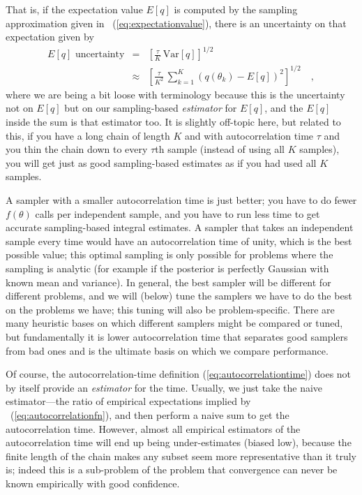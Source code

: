 \documentclass[12pt,twoside,pdftex]{article}
\newcommand{\Var}{\mathrm{Var}}
\newcommand{\pars}{\theta}
\begin{document}
That is, if the expectation value $E[q]$ is computed by the sampling
approximation given in \equationname~(\ref{eq:expectationvalue}),
there is an uncertainty on that expectation given by
\begin{eqnarray}
  \mbox{$E[q]$ uncertainty} &=& \left[\frac{\tau}{K}\,\Var[q]\right]^{1/2}
  \\
  &\approx& \left[\frac{\tau}{K^2}\,\sum_{k=1}^K \left(q(\pars_k) - E[q]\right)^2\right]^{1/2}
  \quad ,
\end{eqnarray}
where we are being a bit loose with terminology because this is the
uncertainty not on $E[q]$ but on our sampling-based \emph{estimator} for
$E[q]$, and the $E[q]$ inside the sum is that estimator too.
It is slightly off-topic here, but related to this, if you have a long
chain of length $K$ and with autocorrelation time $\tau$ and you thin
the chain down to every $\tau$th sample (instead of using all $K$
samples), you will get just as good sampling-based estimates as if you
had used all $K$ samples.

A sampler with a smaller autocorrelation time is just better; you have
to do fewer $f(\pars)$ calls per independent sample, and you have to
run less time to get accurate sampling-based integral estimates.
A sampler that takes an independent sample every time would have an
autocorrelation time of unity, which is the best possible value; this
optimal sampling is only possible for problems where the sampling is
analytic (for example if the posterior is perfectly Gaussian with
known mean and variance).
In general, the best sampler will be different for different problems,
and we will (below) tune the samplers we have to do the best on the
problems we have; this tuning will also be problem-specific.
There are many heuristic bases on which different samplers might be
compared or tuned, but fundamentally it is lower autocorrelation time
that separates good samplers from bad ones and is the ultimate basis
on which we compare performance.

Of course, the autocorrelation-time definition
(\ref{eq:autocorrelationtime}) does not by itself provide an
\emph{estimator} for the time.
Usually, we just take the naive estimator---the ratio of empirical
expectations implied by \equationname~(\ref{eq:autocorrelationfn}),
and then perform a naive sum to get the autocorrelation time.
However, almost all empirical estimators of the autocorrelation time
will end up being under-estimates (biased low), because the finite
length of the chain makes any subset seem more representative than it
truly is; indeed this is a sub-problem of the problem that convergence
can never be known empirically with good confidence.
\end{document}
